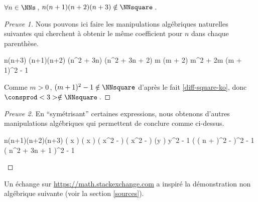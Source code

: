 \begin{fact} \label{case-4}
	 $\forall n \in \NNs$\,, $n(n+1)(n+2)(n+3) \notin \NNsquare$\,.
\end{fact}




\begin{proof}[Preuve 1]
    Nous pouvons ici faire les manipulations algébriques naturelles suivantes qui cherchent à obtenir le même coefficient pour $n$ dans chaque parenthèse.
    
    \medskip
    
    \begin{stepcalc}[style = sar]
    \explnext{}
    	n(n+3) \cdot (n+1)(n+2)
    \explnext{}
    	(n^2 + 3n) \cdot (n^2 + 3n + 2)
    	m (m + 2)
    \explnext{}
    	m^2 + 2m
    \explnext{}
    	(m + 1)^2 - 1
    \end{stepcalc}
    
    \medskip
    
    Comme $m > 0$\,, $(m + 1)^2 - 1 \notin \NNsquare$ d'après le fait \ref{diff-square-ko}, donc $\consprod<3> \notin \NNsquare$\,. 
\end{proof}




\begin{proof}[Preuve 2]
	En \enquote{symétrisant} certaines expressions, nous obtenons d'autres manipulations algébriques qui permettent de conclure comme ci-dessus.
    
    \medskip
    
    \begin{stepcalc}[style = sar]
    \explnext{}
    	n(n+1)(n+2)(n+3)
    	\big( x \pm {} \big) \big( x \pm {} \big)
    \explnext{}
    	\big( x^2 -  \big) \big( x^2 -  \big)
    	(y )
    \explnext{}
    	y^2 - 1
    \explnext{}
    	\Big( \big( n +  \big)^2 -  \Big)^2 - 1
    \explnext{}
    	\big( n^2 + 3n + 1 \big)^2 - 1
    \end{stepcalc}

    \vspace{-1.5ex}
    \qedhere
\end{proof}




Un échange sur \url{https://math.stackexchange.com} a inspiré la démonstration non algébrique suivante (voir la section \ref{sources}).	
	
